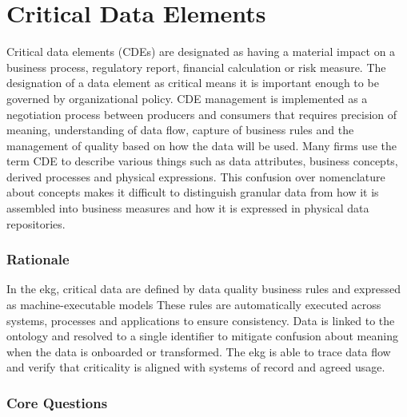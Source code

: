 \section{Critical Data Elements}\label{sec:b-4-5} %

Critical data elements (CDEs) are designated as having a material impact on a business process, regulatory report, financial calculation or risk measure.
The designation of a data element as critical means it is important enough to be governed by organizational policy.
CDE management is implemented as a negotiation process between producers and consumers that requires precision of meaning,
understanding of data flow, capture of business rules and the management of quality based on how the data will be used.
Many firms use the term CDE to describe various things such as data attributes, business concepts, derived processes and physical expressions.
This confusion over nomenclature about concepts makes it difficult to distinguish granular data from how it is assembled into business measures and how it is expressed in physical data repositories.

\subsubsection*{ Rationale}

In the \acrshort{ekg}, critical data are defined by data quality business rules and expressed as machine-executable models
These rules are automatically executed across systems, processes and applications to ensure consistency.
Data is linked to the ontology and resolved to a single identifier to mitigate confusion about meaning when the data is onboarded or transformed.
The \acrshort{ekg} is able to trace data flow and verify that criticality is aligned with systems of record and agreed usage.

\subsubsection*{Core Questions}

